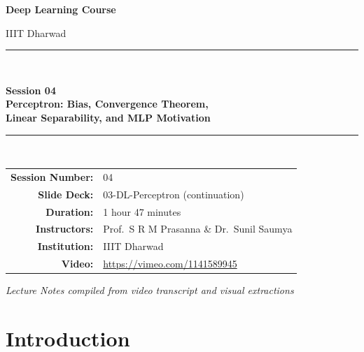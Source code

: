\documentclass[12pt,a4paper]{article}
\begin{document}
\begin{titlepage}
  \centering
  \vspace*{2cm}
  {\Large\bfseries Deep Learning Course\par}
  \vspace{0.5cm}
  {\large IIIT Dharwad\par}
  \vspace{1.5cm}
  \rule{\linewidth}{0.5mm}\\[0.4cm]
  {\huge\bfseries Session 04\\[0.3cm]
   Perceptron: Bias, Convergence Theorem,\\
   Linear Separability, and MLP Motivation\par}
  \rule{\linewidth}{0.5mm}\\[1.5cm]

  \begin{tabular}{rl}
    \textbf{Session Number:} & 04 \\[4pt]
    \textbf{Slide Deck:}     & 03-DL-Perceptron (continuation) \\[4pt]
    \textbf{Duration:}       & 1 hour 47 minutes \\[4pt]
    \textbf{Instructors:}    & Prof.\ S R M Prasanna \& Dr.\ Sunil Saumya \\[4pt]
    \textbf{Institution:}    & IIIT Dharwad \\[4pt]
    \textbf{Video:}          & \url{https://vimeo.com/1141589945} \\[4pt]
  \end{tabular}

  \vfill
  {\large\itshape Lecture Notes compiled from video transcript and visual extractions\par}
\end{titlepage}


\newpage

\section{Introduction}
\label{sec:intro}
\end{document}
